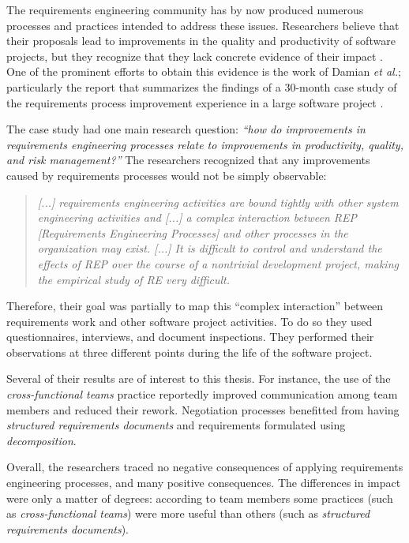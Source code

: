 The requirements engineering community has by now produced numerous processes and practices intended to address these issues. Researchers believe that their proposals lead to improvements in the quality and productivity of software projects, but they recognize that they lack concrete evidence of their impact \cite{Kaindl2002}. One of the prominent efforts to obtain this evidence is the work of Damian \emph{et al.}; particularly the report that summarizes the findings of a 30-month case study of the requirements process improvement experience in a large software project \cite{Damian2006}.

The case study had one main research question: \emph{``how do improvements in requirements engineering processes relate to improvements in productivity, quality, and risk management?''} The researchers recognized that any improvements caused by requirements processes would not be simply observable:

\begin{quote}
\emph{[...] requirements engineering activities are bound tightly with other system engineering activities and [...] a complex interaction between REP [Requirements Engineering Processes] and other processes in the organization may exist. [...] It is difficult to control and understand the effects of REP over the course of a nontrivial development project, making the empirical study of RE very difficult.}
\end{quote}

Therefore, their goal was partially to map this ``complex interaction'' between requirements work and other software project activities. To do so they used questionnaires, interviews, and document inspections. They performed their observations at three different points during the life of the software project.

Several of their results are of interest to this thesis. For instance, the use of the \emph{cross-functional teams} practice reportedly improved communication among team members and reduced their rework. Negotiation processes benefitted from having \emph{structured requirements documents} and requirements formulated using \emph{decomposition}.

Overall, the researchers traced no negative consequences of applying requirements engineering processes, and many positive consequences. The differences in impact were only a matter of degrees: according to team members some practices (such as \emph{cross-functional teams}) were more useful than others (such as \emph{structured requirements documents}).

